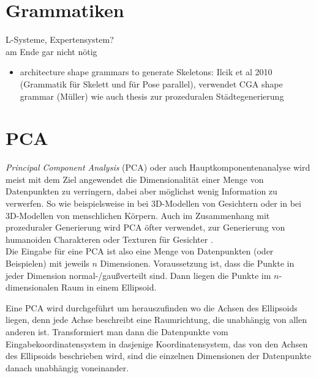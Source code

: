 \section{Grammatiken}

L-Systeme, Expertensystem?\\
am Ende gar nicht nötig

\begin{itemize}
 \item architecture shape grammars to generate Skeletons: Ilcik et al 2010 (Grammatik für Skelett und für Pose parallel), verwendet CGA shape grammar (Müller) wie auch thesis zur prozeduralen Städtegenerierung
\end{itemize}



\section{PCA} %
\label{PCA}

 
 \emph{Principal Component Analysis} (PCA) oder auch Hauptkomponentenanalyse \cite{PCA} wird meist mit dem Ziel angewendet die Dimensionalität einer Menge von Datenpunkten zu verringern, dabei aber möglichst wenig Information zu verwerfen.
 So wie beispielsweise in \cite{PCA_faces} bei 3D-Modellen von Gesichtern oder in \cite{PCA_bodies} bei 3D-Modellen von menschlichen Körpern. Auch im Zusammenhang mit prozeduraler Generierung wird PCA öfter verwendet, \zb zur Generierung von humanoiden Charakteren \cite{ProceduralCharacterGeneration} oder Texturen für Gesichter \cite{GeneratingFacialTextures}. \\
 Die Eingabe für eine PCA ist also eine Menge von Datenpunkten (oder Beispielen) mit jeweils $n$ Dimensionen. Voraussetzung ist, dass die Punkte in jeder Dimension normal-/gaußverteilt sind. Dann liegen die Punkte im $n$-dimensionalen Raum in einem Ellipsoid.
 
 Eine PCA wird durchgeführt um herauszufinden wo die Achsen des Ellipsoids liegen, denn jede Achse beschreibt eine Raumrichtung, die unabhängig von allen anderen ist.
 Transformiert man dann die Datenpunkte vom Eingabekoordinatensystem in dasjenige Koordinatensystem, das von den Achsen des Ellipsoids beschrieben wird, sind die einzelnen Dimensionen der Datenpunkte danach unabhängig voneinander.
 

